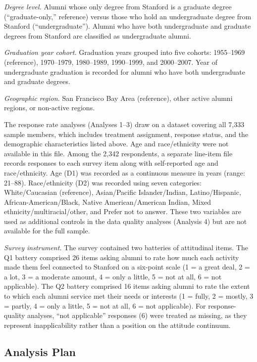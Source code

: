 \documentclass[12pt]{article}
\begin{document}
\textit{Degree level.} Alumni whose only degree from Stanford is a graduate degree (``graduate-only,'' reference) versus those who hold an undergraduate degree from Stanford (``undergraduate''). Alumni who have both undergraduate and graduate degrees from Stanford are classified as undergraduate alumni.

\textit{Graduation year cohort.} Graduation years grouped into five cohorts: 1955--1969 (reference), 1970--1979, 1980--1989, 1990--1999, and 2000--2007. Year of undergraduate graduation is recorded for alumni who have both undergraduate and graduate degrees.

\textit{Geographic region.} San Francisco Bay Area (reference), other active alumni regions, or non-active regions.

The response rate analyses (Analyses 1--3) draw on a dataset covering all 7,333 sample members, which includes treatment assignment, response status, and the demographic characteristics listed above. Age and race/ethnicity were not available in this file. Among the 2,342 respondents, a separate line-item file records responses to each survey item along with self-reported age and race/ethnicity. Age (D1) was recorded as a continuous measure in years (range: 21--88). Race/ethnicity (D2) was recorded using seven categories: White/Caucasian (reference), Asian/Pacific Islander/Indian, Latino/Hispanic, African-American/Black, Native American/American Indian, Mixed ethnicity/multiracial/other, and Prefer not to answer. These two variables are used as additional controls in the data quality analyses (Analysis 4) but are not available for the full sample.

\textit{Survey instrument.} The survey contained two batteries of attitudinal items. The Q1 battery comprised 26 items asking alumni to rate how much each activity made them feel connected to Stanford on a six-point scale (1 = a great deal, 2 = a lot, 3 = a moderate amount, 4 = only a little, 5 = not at all, 6 = not applicable). The Q2 battery comprised 16 items asking alumni to rate the extent to which each alumni service met their needs or interests (1 = fully, 2 = mostly, 3 = partly, 4 = only a little, 5 = not at all, 6 = not applicable). For response-quality analyses, ``not applicable'' responses (6) were treated as missing, as they represent inapplicability rather than a position on the attitude continuum.

\subsection{Analysis Plan}
\end{document}
